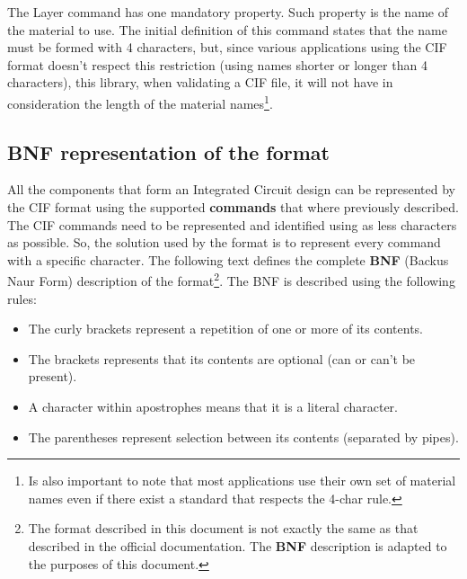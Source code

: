 \documentclass[11pt,twoside,openany,x11names,svgnames]{memoir}
\begin{document}
The Layer command has one mandatory property. Such property is the name of the material to use. The initial definition of this command states that the name must be formed with 4 characters, but, since various applications using the CIF format doesn't respect this restriction (using names shorter or longer than 4 characters), this library, when validating a CIF file, it will not have in consideration the length of the material names\footnote{Is also important to note that most applications use their own set of material names even if there exist a standard that respects the 4-char rule.}.

\subsection{BNF representation of the format}\label{BNF-representation-of-the-format}

All the components that form an Integrated Circuit design can be represented by the CIF format using the supported \textbf{commands} that where previously described. The CIF commands need to be represented and identified using as less characters as possible. So, the solution used by the format is to represent every command with a specific character. The following text defines the complete \textbf{BNF} (Backus Naur Form) description of the format\footnote{The format described in this document is not exactly the same as that described in the official documentation. The \textbf{BNF} description is adapted to the purposes of this document.}. The BNF is described using the following rules:

\begin{itemize}
\item The curly brackets represent a repetition of one or more of its contents.
\item The brackets represents that its contents are optional (can or can't be present).
\item A character within apostrophes means that it is a literal character.
\item The parentheses represent selection between its contents (separated by pipes).
\end{itemize}
\end{document}
